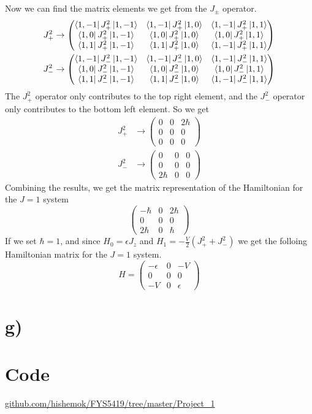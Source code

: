 \documentclass[11pt, letterpaper, titlepage]{article}
\begin{document}
Now we can find the matrix elements we get from the \(J_±\) operator.
\[
\begin{aligned}
        J_+^2 &\rightarrow
        \begin{pmatrix}
          \bra{1,-1} J_+ ^2 \ket{1,-1} & \bra{1,-1} J_+ ^2 \ket{1,0} & \bra{1,-1} J_+ ^2 \ket{1,1} \\
                \bra{1,0} J_+ ^2 \ket{1,-1} & \bra{1,0} J_+ ^2 \ket{1,0} & \bra{1,0} J_+ ^2 \ket{1,1} \\
                \bra{1,1} J_+ ^2 \ket{1,-1} & \bra{1,1} J_+ ^2 \ket{1,0} & \bra{1,-1} J_+ ^2 \ket{1,1}
        \end{pmatrix}\\
        J_-^2 &\rightarrow
        \begin{pmatrix}
                \bra{1,-1} J_- ^2 \ket{1,-1} & \bra{1,-1} J_- ^2 \ket{1,0} & \bra{1,-1} J_- ^2 \ket{1,1} \\
                \bra{1,0} J_- ^2 \ket{1,-1} & \bra{1,0} J_- ^2 \ket{1,0} & \bra{1,0} J_- ^2 \ket{1,1} \\
                \bra{1,1} J_- ^2 \ket{1,-1} & \bra{1,1} J_- ^2 \ket{1,0} & \bra{1,-1} J_- ^2 \ket{1,1}
        \end{pmatrix} 
\end{aligned}
\]
The \(J_+^2\) operator only contributes to the top right element, and the \(J_-^2\) operator only contributes to the bottom left element. So we get
\[
\begin{aligned}
        J_+^2 &\rightarrow
        \begin{pmatrix}
          0 & 0 & 2ℏ \\
          0 & 0 & 0 \\
          0 & 0 & 0
        \end{pmatrix} \\
        J_-^2 &\rightarrow
        \begin{pmatrix}
          0 & 0 & 0 \\
          0 & 0 & 0 \\
          2ℏ & 0 & 0
        \end{pmatrix}
\end{aligned}
\]
Combining the results, we get the matrix representation of the Hamiltonian for the \(J=1\) system
\[
\begin{pmatrix}
  -ℏ & 0 & 2ℏ \\
  0 & 0 & 0 \\
  2ℏ & 0 & ℏ
\end{pmatrix}
\]
If we set \(ℏ = 1\), and since \(H_0 = ϵJ_z\) and \(H_1 = -\frac{V}{2}(J_+ ^2 + J_-^2)\) we get the folloing Hamiltonian matrix for the \(J=1\) system. 
\[
H = 
\begin{pmatrix}
  -ϵ & 0 & -V \\
  0 & 0 & 0 \\
  -V & 0 & ϵ
\end{pmatrix}
\]


\section{g)}

\section{Code}
\href{https://github.com/hishemok/FYS5419/tree/master/Project_1}{github.com/hishemok/FYS5419/tree/master/Project\_1}
\end{document}
